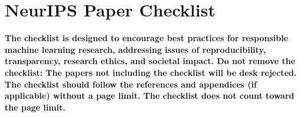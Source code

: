 \documentclass{article}
\begin{document}




\newpage
\section*{NeurIPS Paper Checklist}

\textbf{The checklist is designed to encourage best practices for responsible machine learning research, addressing issues of reproducibility, transparency, research ethics, and societal impact. Do not remove the checklist: The papers not including the checklist will be desk rejected. The checklist should follow the references and appendices (if applicable) without a page limit. The checklist does not count toward the page limit.}
\end{document}
